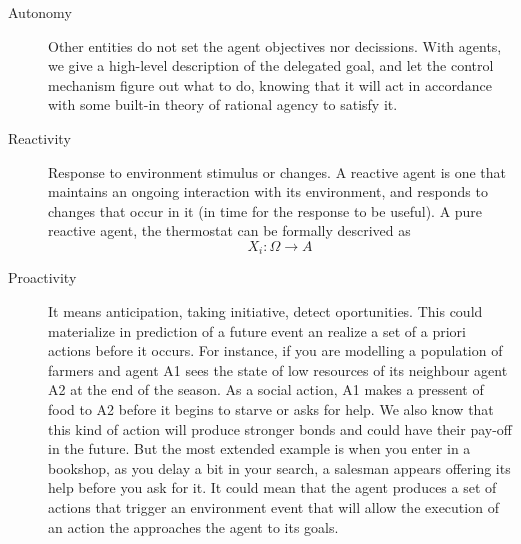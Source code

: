 \documentclass[11pt,oneside,a4paper,openright]{report}
\begin{document}
\begin{description}
	\item [Autonomy] Other entities do not set the agent objectives nor decissions. With agents, 
	we give a high-level description of the delegated goal, and let the control mechanism figure
	out what to do, knowing that it will act in accordance with some built-in theory of rational 
	agency to satisfy it.

	\item [Reactivity] Response to environment stimulus or changes. A reactive agent is 
	one that maintains an ongoing interaction with its environment, and responds to changes 
	that occur in it (in time for the response to be useful). A pure reactive agent, the 
	thermostat can be formally descrived as
	\begin{equation}
		X_i : \Omega \longrightarrow A 
	\end{equation}
	\item [Proactivity] It means anticipation, taking initiative, detect oportunities. This
	could materialize in prediction of a future event an realize a set of a priori actions 
	before it occurs. For instance, if you are modelling a population of farmers and agent A1 
	sees the state of low resources of its neighbour agent A2 at the end of the season. As 
	a social action, A1 makes a pressent of food to A2 before it begins to starve or asks for
	help. We also know that this kind of action will produce stronger bonds and could have their
	pay-off in the future. But the most extended example is when you enter in a bookshop, 
	as you delay a bit in your search, a salesman appears offering its help before you ask for it.
	It could mean that the agent produces a set of actions that trigger an environment event
	that will allow the execution of an action the approaches the agent to its goals.


\end{description}
\end{document}

